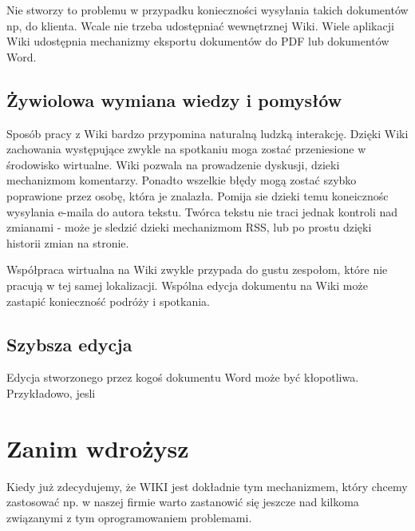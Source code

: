 \documentclass{article}
\begin{document}
Nie stworzy to problemu w przypadku konieczności wysyłania takich dokumentów np, do klienta. Wcale nie trzeba udostępniać wewnętrznej Wiki. Wiele aplikacji Wiki udostępnia mechanizmy eksportu dokumentów do PDF lub dokumentów Word.



	\subsection{Żywiolowa wymiana wiedzy i pomysłów}


Sposób pracy z Wiki bardzo przypomina naturalną ludzką interakcję. Dzięki Wiki zachowania występujące zwykle na spotkaniu moga zostać przeniesione w środowisko wirtualne. Wiki pozwala na prowadzenie dyskusji, dzieki mechanizmom komentarzy. Ponadto wszelkie błędy mogą zostać szybko poprawione przez osobę, która je znalazła. Pomija sie dzieki temu koneicznośc wysylania e-maila do autora tekstu. Twórca tekstu nie traci jednak kontroli nad zmianami - może je sledzić dzieki mechanizmom RSS, lub po prostu dzięki historii zmian na stronie.

Współpraca wirtualna na Wiki zwykle przypada do gustu zespołom, które nie pracują w tej samej lokalizacji. Wspólna edycja dokumentu na Wiki może zastapić konieczność podróży i spotkania. 


	\subsection{Szybsza edycja}

Edycja stworzonego przez kogoś dokumentu Word może być kłopotliwa. Przykładowo, jesli 



\newpage
\section{Zanim wdrożysz}
Kiedy już zdecydujemy, że WIKI jest dokładnie tym mechanizmem, który chcemy zastosować np. w naszej firmie warto zastanowić się jeszcze nad kilkoma związanymi z tym oprogramowaniem problemami.
\end{document}
